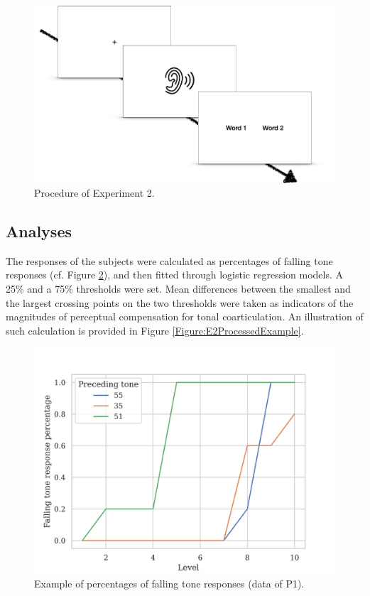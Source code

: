 \documentclass[12pt]{report}
\begin{document}
\begin{CJK}{UTF8}{bsmi}
\begin{figure}[h]
\centering
\includegraphics[width=.7\textwidth]{Figures/E2/Procedure.png}
\caption{Procedure of Experiment 2.}
\label{Figure:Experiment2Procedure}
\end{figure}

\subsection{Analyses}
The responses of the subjects were calculated as percentages of falling tone responses (cf. Figure \ref{Figure:E2RawExample}), and then fitted through logistic regression models. A 25\% and a 75\% thresholds were set. Mean differences between the smallest and the largest crossing points on the two thresholds were taken as indicators of the magnitudes of perceptual compensation for tonal coarticulation. An illustration of such calculation is provided in Figure \ref{Figure:E2ProcessedExample}.

\begin{figure}[h]
\centering
\includegraphics[width=\textwidth]{Figures/E2/RawExample.png}
\caption{Example of percentages of falling tone responses (data of P1).}
\label{Figure:E2RawExample}
\end{figure}


\end{CJK}
\end{document}

